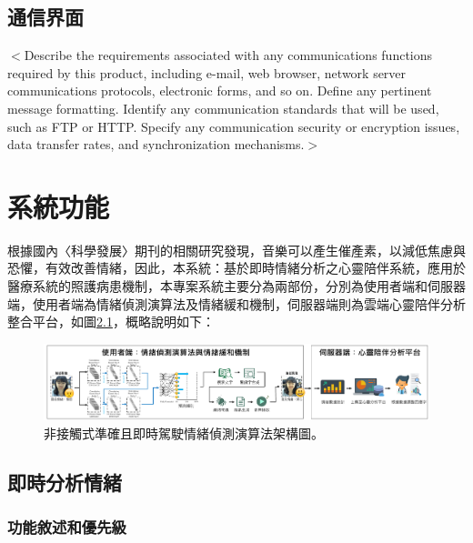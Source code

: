 \documentclass[12pt]{scrreprt}
\begin{document}
\section{通信界面}
$<$Describe the requirements associated with any communications functions 
required by this product, including e-mail, web browser, network server 
communications protocols, electronic forms, and so on. Define any pertinent 
message formatting. Identify any communication standards that will be used, such 
as FTP or HTTP. Specify any communication security or encryption issues, data 
transfer rates, and synchronization mechanisms.$>$


\chapter{系統功能}

根據國內〈科學發展〉期刊的相關研究發現，音樂可以產生催產素，以減低焦慮與恐懼，有效改善情緒，因此，本系統：基於即時情緒分析之心靈陪伴系統，應用於醫療系統的照護病患機制，本專案系統主要分為兩部份，分別為使用者端和伺服器端，使用者端為情緒偵測演算法及情緒緩和機制，伺服器端則為雲端心靈陪伴分析整合平台，如圖\ref{fig:framework}，概略說明如下：

\begin{figure}[!h]
\begin{center}
\includegraphics[width=1\textwidth]{./figs/framework-version2.pdf}
\end{center}
\caption{非接觸式準確且即時駕駛情緒偵測演算法架構圖。}
\label{fig:framework}
\end{figure}

\section{即時分析情緒}

\subsection{功能敘述和優先級}
\end{document}
